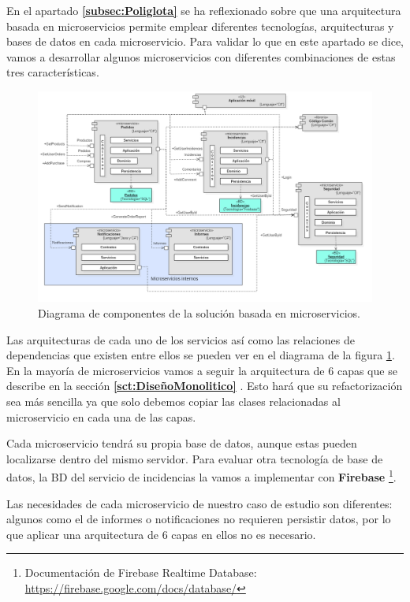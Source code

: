 \documentclass[11pt,spanish,listoffigures]{tfgetsinf}
\begin{document}
En el apartado \textbf{\ref{subsec:Poliglota} } se ha reflexionado sobre que una arquitectura basada en microservicios permite emplear diferentes tecnologías, arquitecturas y bases de datos en cada microservicio. Para validar lo que en este apartado se dice, vamos a desarrollar algunos microservicios con diferentes combinaciones de estas tres características.
\begin{figure}[h]
\centering
\includegraphics[scale=0.35]{Componentes}
\caption{Diagrama de componentes de la solución basada en microservicios.}
\label{fig:Componentes}
\end{figure}

Las arquitecturas de cada uno de los servicios así como las relaciones de dependencias que existen entre ellos se pueden ver en el diagrama de la figura \ref{fig:Componentes}. En la mayoría de microservicios vamos a seguir la arquitectura de 6 capas que se describe en la sección \textbf{\ref{sct:DiseñoMonolitico} }. Esto hará que su refactorización sea más sencilla ya que solo debemos copiar las clases relacionadas al microservicio en cada una de las capas. 

Cada microservicio tendrá su propia base de datos, aunque estas pueden localizarse dentro del mismo servidor. Para evaluar otra tecnología de base de datos, la BD del servicio de incidencias la vamos a implementar con \textbf{Firebase} \footnote{ Documentación de Firebase Realtime Database: \url{https://firebase.google.com/docs/database/}}.

Las necesidades de cada microservicio de nuestro caso de estudio son diferentes: algunos como el de informes o notificaciones no requieren persistir datos, por lo que aplicar una arquitectura de 6 capas en ellos no es necesario. 
\end{document}
